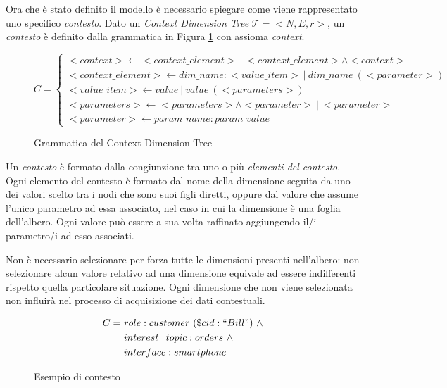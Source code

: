 Ora che è stato definito il modello è necessario spiegare come viene rappresentato uno specifico \emph{contesto}. Dato un \emph{Context Dimension Tree} $\mathcal{T} = {<}N, E, r{>} $, un \emph{contesto} è definito dalla grammatica in Figura \ref{fig:grammatica-cdt} con assioma \emph{context}.

\begin{figure}[ht]
	\begin{equation*}
	C =
	\begin{cases}
		{<}context{>} \leftarrow {<}context\_element{>}\ |\ {<}context\_element{>} \land {<}context{>}\\
		{<}context\_element{>} \leftarrow dim\_name: {<}value\_item{>}\ |\ dim\_name\ ({<}parameter{>})\\
		{<}value\_item{>} \leftarrow value\ |\ value\ ({<}parameters{>})\\
		{<}parameters{>} \leftarrow {<}parameters{>} \land {<}parameter{>}\ |\ {<}parameter{>}\\
		{<}parameter{>} \leftarrow param\_name: param\_value
	\end{cases}
	\end{equation*}
	\caption{Grammatica del Context Dimension Tree}\label{fig:grammatica-cdt}
\end{figure}

Un \emph{contesto} è formato dalla congiunzione tra uno o più \emph{elementi del contesto}. Ogni elemento del contesto è formato dal nome della dimensione seguita da uno dei valori scelto tra i nodi che sono suoi figli diretti, oppure dal valore che assume l'unico parametro ad essa associato, nel caso in cui la dimensione è una foglia dell'albero. Ogni valore può essere a sua volta raffinato aggiungendo il/i parametro/i ad esso associati.

Non è necessario selezionare per forza tutte le dimensioni presenti nell'albero: non selezionare alcun valore relativo ad una dimensione equivale ad essere indifferenti rispetto quella particolare situazione. Ogni dimensione che non viene selezionata non influirà nel processo di acquisizione dei dati contestuali.

\begin{figure}[ht]
	\begin{align*}
		C =\ &role : customer\ (\$cid : ``Bill")\ \land \\
			&interest\_topic : orders\ \land \\
			&interface : smartphone
	\end{align*}
	\caption{Esempio di contesto}\label{fig:esempio-contesto-base}
\end{figure}

